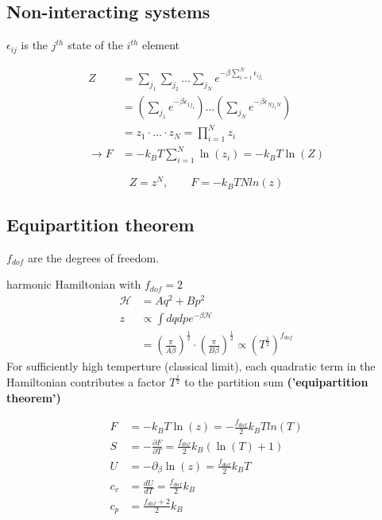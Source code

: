\subsection*{Non-interacting systems}
$\epsilon_{ij}$ is the $j^{th}$ state of the $i^{th}$ element

\[
    \begin{aligned}
        Z &= \sum_{j_1} \sum_{j_2} \dots \sum_{j_N} e^{-\beta \sum_{i=1}^N \epsilon_{ij_i}} \\
        &= \left(\sum_{j_1} e^{-\beta \epsilon_{1j_1}}\right) \dots \left(\sum_{j_N} e^{-\beta \epsilon_{Nj_1N}}\right) \\
        &= z_1 \cdot \dots \cdot z_N = \prod_{i=1}^N z_i \\
        \rightarrow F &= -k_B T \sum_{i=1}^N \ln(z_i) = -k_B T \ln(Z)
    \end{aligned}
\]

\[
    Z = z^N , \qquad F = -k_B T N ln(z)
\]

\subsection*{Equipartition theorem}
$f_{dof}$ are the degrees of freedom.

harmonic Hamiltonian with $f_{dof}=2$
\[
    \begin{aligned}
        \mathcal{H} &= Aq^2 + Bp^2 \\
        z &\propto \int dq dp e^{-\beta \mathcal{H}} \\
        &= \left(\frac{\pi}{A\beta}\right)^{\frac{1}{2}} \cdot \left(\frac{\pi}{B \beta}\right)^{\frac{1}{2}} \propto \left(T^{\frac{1}{2}}\right)^{f_{dof}}
    \end{aligned}
\]
For sufficiently high temperture (classical limit), each quadratic term 
in the Hamiltonian contributes a factor $T^{\frac{1}{2}}$ to the partition sum \textbf{('equipartition theorem')}

\[
    \begin{aligned}
        F &= -k_B T \ln(z) = - \frac{f_{dof}}{2} k_B T ln(T) \\
        S &= - \frac{\partial F}{\partial T} = \frac{f_{dof}}{2} k_B (\ln(T)+1) \\
        U &= - \partial_\beta \ln (z) = \frac{f_{dof}}{2} k_B T \\
        c_v &= \frac{dU}{dT} = \frac{f_{dof}}{2} k_B \\
        c_p &= \frac{f_{dof}+2}{2} k_B
    \end{aligned}
\]

